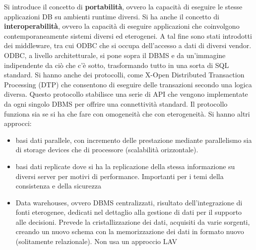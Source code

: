 Si introduce il concetto di \textbf{portabilità}, ovvero la capacità di eseguire
le stesse applicazioni DB su ambienti runtime diversi. Si ha anche il concetto
di \textbf{interoperabilità}, ovvero la capacità di eseguire applicazioni che
coinvolgono contemporaneamente sistemi diversi ed eterogenei. A tal fine sono
stati introdotti dei middleware, tra cui ODBC che si occupa dell'accesso a dati
di diversi vendor. ODBC, a livello architetturale, si pone sopra il DBMS e da
un'immagine indipendente da ciò che c'è sotto, trasformando tutto in una sorta
di SQL standard. Si hanno anche dei protocolli, come X-Open Distributed
Transaction Processing (DTP) che consentono di eseguire delle transazioni secondo
una logica diversa. Questo protocollo stabilisce una serie di API che vengono
implementate da ogni singolo DBMS per offrire una connettività standard.
Il protocollo funziona sia se si ha che fare con omogeneità che con eterogeneità.
Si hanno altri approcci:
\begin{itemize}
    \item basi dati parallele, con incremento delle prestazione mediante
          parallelismo sia di storage devices che di processore (scalabilità
          orizzontale).
    \item basi dati replicate dove si ha la replicazione della stessa informazione
          su diversi server per motivi di performance. Importanti
          per i temi della consistenza e della sicurezza
    \item Data warehouses, ovvero DBMS centralizzati, risultato dell'integrazione
          di fonti eterogenee, dedicati nel dettaglio alla gestione
          di dati per il supporto alle decisioni. Prevede la cristallizzazione
          dei dati, acquisiti da varie sorgenti, creando un nuovo schema
          con la memorizzazione dei dati in formato nuovo (solitamente
          relazionale). Non usa un approccio LAV
\end{itemize}
